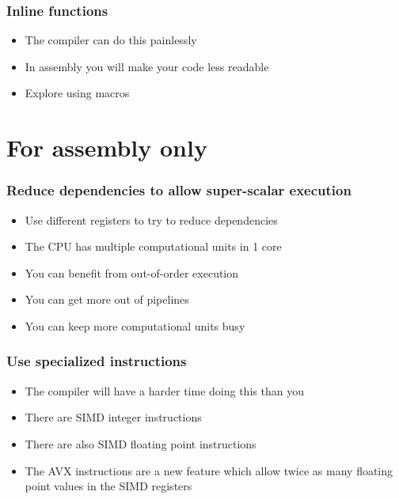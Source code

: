 \documentclass{beamer}
\begin{document}
\begin{frame}
    \frametitle{Inline functions}
    \begin{itemize}
        \item The compiler can do this painlessly
        \item In assembly you will make your code less readable
        \item Explore using macros
    \end{itemize}
\end{frame}

\section{For assembly only}

\begin{frame}[fragile]
    \frametitle{Reduce dependencies to allow super-scalar execution}
    \begin{itemize}
        \item Use different registers to try to reduce dependencies
        \item The CPU has multiple computational units in 1 core
        \item You can benefit from out-of-order execution
        \item You can get more out of pipelines
        \item You can keep more computational units busy
    \end{itemize}
\end{frame}

\begin{frame}
    \frametitle{Use specialized instructions}
    \begin{itemize}
        \item The compiler will have a harder time doing this than you
        \item There are SIMD integer instructions
        \item There are also SIMD floating point instructions
        \item The AVX instructions are a new feature which allow twice as
              many floating point values in the SIMD registers
    \end{itemize}
\end{frame}
\end{document}
